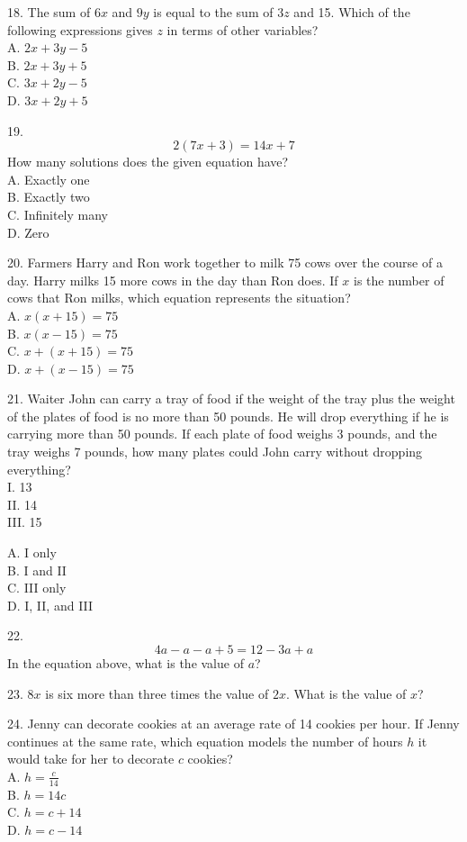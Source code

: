 \documentclass[../satmath.tex]{subfiles}
\begin{document}
18. The sum of $6x$ and $9y$ is equal to the sum of $3z$ and 15. Which of the following expressions gives $z$ in terms of other variables?\\
A. $2x+3y-5$\\
B. $2x+3y+5$\\
C. $3x+2y-5$\\
D. $3x+2y+5$
\medbreak

19. 
\[2(7x+3)=14x+7\]
How many solutions does the given equation have?\\
A. Exactly one\\
B. Exactly two\\
C. Infinitely many\\
D. Zero
\medbreak

20. Farmers Harry and Ron work together to milk 75 cows over the course of a day. Harry milks 15 more cows in the day than Ron does.
If $x$ is the number of cows that Ron milks, which equation represents the situation?\\
A. $x(x+15)=75$\\
B. $x(x-15)=75$\\
C. $x+(x+15) = 75$\\
D. $x+(x-15) = 75$
\medbreak

21. Waiter John can carry a tray of food if the weight of the tray plus the weight of the plates of food is no more than 50 pounds. He 
will drop everything if he is carrying more than 50 pounds. If each plate of food weighs 3 pounds, and the tray weighs 7 pounds, how many 
plates could John carry without dropping everything?\\
I. 13\\
II. 14\\
III. 15

A. I only\\
B. I and II\\
C. III only\\
D. I, II, and III
\medbreak

22. 
\[4a-a-a+5=12-3a+a\]
In the equation above, what is the value of $a$?
\medbreak

23. $8x$ is six more than three times the value of $2x$. What is the value of $x$?
\medbreak

24. Jenny can decorate cookies at an average rate of 14 cookies per hour. If Jenny continues at the same rate, which equation models the number 
of hours $h$ it would take for her to decorate $c$ cookies?\\
A. $h=\frac{c}{14}$\\
B. $h=14c$\\
C. $h=c+14$\\
D. $h=c-14$
\medbreak
\end{document}
